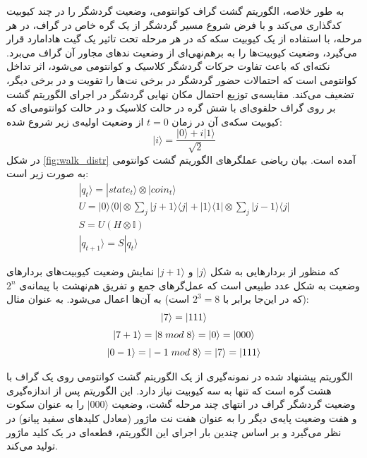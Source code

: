 به طور خلاصه، الگوریتم گشت گراف کوانتومی، وضعیت گردشگر را در چند کیوبیت کدگذاری می‌کند و با فرض شروع مسیر گردشگر از یک گره خاص در گراف، در هر مرحله، با استفاده از یک کیوبیت سکه که در هر مرحله تحت تاثیر یک گیت هادامارد قرار می‌گیرد، وضعیت کیوبیت‌ها را به برهم‌نهی‌ای از وضعیت ندهای مجاور آن گراف می‌برد. نکته‌ای که باعث تفاوت حرکات گردشگر کلاسیک و کوانتومی می‌شود، اثر تداخل کوانتومی است که احتمالات حضور گردشگر در برخی نت‌ها را تقویت و در برخی دیگر، تضعیف می‌کند.
مقایسه‌ی توزیع احتمال مکان نهایی گردشگر در اجرای الگوریتم گشت بر روی گراف حلقوی‌ای با شش گره در حالت کلاسیک و در حالت کوانتومی‌ای که کیوبیت سکه‌ی آن در زمان
$t=0$
از وضعیت اولیه‌ی زیر شروع شده:
\begin{equation}
    |i\rangle = \frac{|0\rangle + i|1\rangle}{\sqrt{2}}
\end{equation}
در شکل
\ref{fig:walk_distr}
آمده است.
بیان ریاضی عملگرهای الگوریتم گشت کوانتومی به صورت زیر است:
\begin{equation}
\begin{gathered}
    |q_t\rangle = |state_t\rangle \otimes |coin_t\rangle \\[3pt]
    U = |0\rangle \langle 0| \otimes \sum_j |j + 1\rangle \langle j| + |1\rangle \langle 1| \otimes \sum_j |j - 1\rangle
    \langle j| \\[3pt]
    S = U(H \otimes \mathbb{I}) \\[3pt]
    |q_{t+1}\rangle = S|q_t \rangle
\end{gathered}
\end{equation}

که منظور از بردارهایی به شکل
$|j\rangle$
و 
$|j+1\rangle$
نمایش وضعیت کیوبیت‌های بردارهای وضعیت به شکل عدد طبیعی است که عمل‌گرهای جمع و تفریق هم‌نهشت با پیمانه‌ی
$2^n$
(که در این‌جا برابر با 
$2^3 = 8$
است)
به آن‌ها اعمال می‌شود. به عنوان مثال:
\begin{equation}
    \begin{gathered}
        |7\rangle = |111\rangle \\[3pt]
        |7 + 1\rangle = |8 \hspace{1mm} mod \hspace{1mm} 8\rangle = |0\rangle = |000\rangle \\[3pt]
        |0 - 1\rangle = |-1 \hspace{1mm} mod \hspace{1mm} 8\rangle = |7\rangle = |111\rangle
    \end{gathered}
\end{equation}

الگوریتم پیشنهاد شده در 
\cite{miranda}
نمونه‌گیری از یک الگوریتم گشت کوانتومی روی یک گراف با هشت گره است که تنها به سه کیوبیت نیاز دارد. این الگوریتم پس از اندازه‌گیری وضعیت گردشگر گراف در انتهای چند مرحله گشت، وضعیت
$|000\rangle$
را به عنوان سکوت و هفت وضعیت پایه‌ی دیگر را به عنوان هفت نت ماژور (معادل کلیدهای سفید پیانو) در نظر می‌گیرد و بر اساس چندین بار اجرای این الگوریتم، قطعه‌ای در یک کلید ماژور تولید می‌کند.
